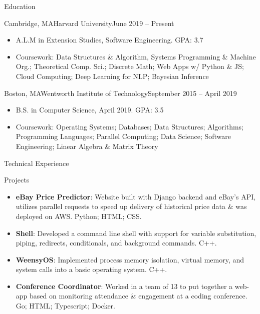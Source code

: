 \documentclass[]{mcdowellcv}
\begin{document}
	\begin{cvsection}{Education}
		\begin{cvsubsection}{Cambridge, MA}{Harvard University}{June 2019 -- Present}
		
			\begin{itemize}
				\item A.L.M in Extension Studies, Software Engineering. GPA: 3.7
				\item Coursework: Data Structures \& Algorithm, Systems Programming \& Machine Org.; Theoretical Comp. Sci.; Discrete Math; Web Apps w/ Python \& JS; Cloud Computing; Deep Learning for NLP; Bayesian Inference
				\end{itemize}
		\end{cvsubsection}
		\begin{cvsubsection}{Boston, MA}{Wentworth Institute of Technology}{September 2015 -- April 2019}
		\vspace{2mm}
			\begin{itemize}
				\item B.S. in Computer Science, April 2019. GPA: 3.5
				\item Coursework: Operating Systems; Databases; Data Structures; Algorithms; Programming Languages; Parallel Computing; Data Science; Software Engineering; Linear Algebra \& Matrix Theory
			\end{itemize}
		\end{cvsubsection}
	\end{cvsection}
	
	\begin{cvsection}{Technical Experience}
		\begin{cvsubsection}{Projects}{}{}
			\begin{itemize}
				\item \textbf{eBay Price Predictor}: Website built with Django backend and eBay's API, utilizes parallel requests to speed up delivery of historical price data \& was deployed on AWS. Python; HTML; CSS.
				\item \textbf{Shell}: Developed a command line shell with support for variable substitution, piping, redirects, conditionals, and background commands. C++.
				\item \textbf{WeensyOS}: Implemented process memory isolation, virtual memory, and system calls into a basic operating system. C++.
				\item \textbf{Conference Coordinator}: Worked in a team of 13 to put together a web-app based on monitoring attendance \& engagement at a coding conference. Go; HTML; Typescript; Docker.
			\end{itemize}
		\end{cvsubsection}
	\end{cvsection}
	
\end{document}

